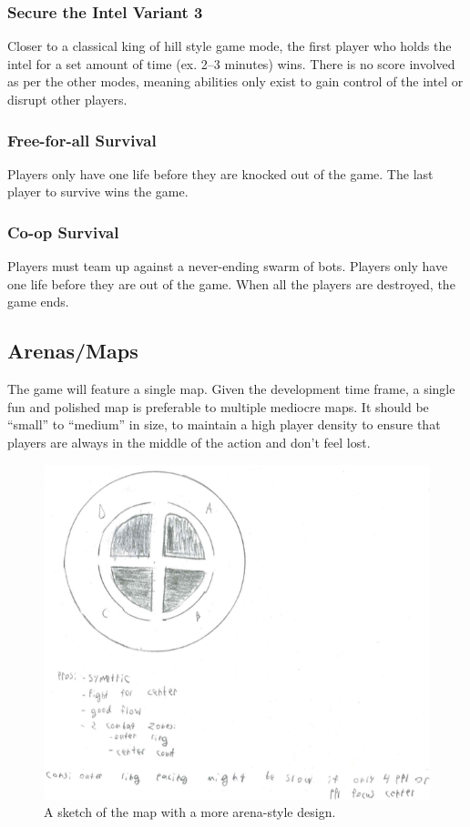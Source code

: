 \documentclass{article}
\theoremstyle{definition}
\begin{document}
\subsubsection{Secure the Intel Variant 3}

Closer to a classical king of hill style game mode, the first player who holds
the intel for a set amount of time (ex. 2--3 minutes) wins. There is no score
involved as per the other modes, meaning abilities only exist to gain control
of the intel or disrupt other players.

\subsubsection{Free-for-all Survival}

Players only have one life before they are knocked out of the game. The last
player to survive wins the game.

\subsubsection{Co-op Survival}

Players must team up against a never-ending swarm of bots. Players only have
one life before they are out of the game. When all the players are destroyed,
the game ends.

\subsection{Arenas/Maps}

The game will feature a single map. Given the development time frame, a single
fun and polished map is preferable to multiple mediocre maps. It should be
``small'' to ``medium'' in size, to maintain a high player density to ensure
that players are always in the middle of the action and don't feel lost.

\begin{figure}[htpb]
  \centering
  \includegraphics[width=0.8\linewidth]{images/austin_map2.png}
  \caption{A sketch of the map with a more arena-style design.}
\label{fig:austin_map1}
\end{figure}
\end{document}
